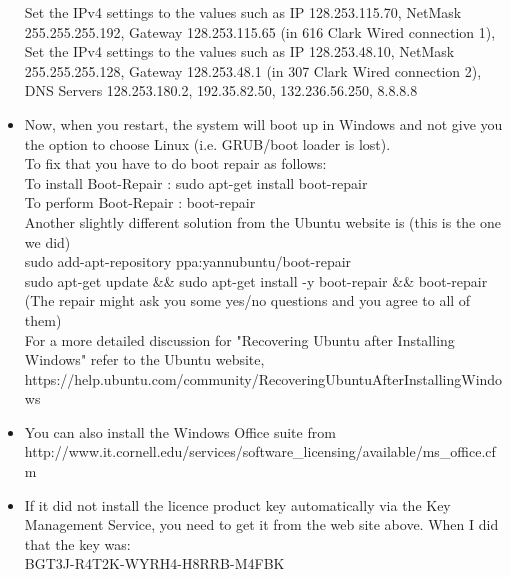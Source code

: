 \documentclass[12pt]{article}
\begin{document}
\begin{itemize}
      Set the IPv4 settings to the values such as IP 128.253.115.70, NetMask 255.255.255.192, Gateway 128.253.115.65 (in 616 Clark Wired connection 1), \\
      Set the IPv4 settings to the values such as IP 128.253.48.10, NetMask 255.255.255.128, Gateway 128.253.48.1 (in 307 Clark Wired connection 2), \\
      DNS Servers 128.253.180.2, 192.35.82.50, 132.236.56.250, 8.8.8.8
\item Now, when you restart, the system will boot up in Windows and not give you the option to choose Linux (i.e. GRUB/boot loader is lost). \\
      To fix that you have to do boot repair as follows:\\
      To install Boot-Repair : sudo apt-get install boot-repair\\
      To perform Boot-Repair : boot-repair \\
      Another slightly different solution from the Ubuntu website is (this is the one we did) \\
      sudo add-apt-repository ppa:yannubuntu/boot-repair \\
      sudo apt-get update \&\& sudo apt-get install -y boot-repair \&\& boot-repair  \\
      (The repair might ask you some yes/no questions and you agree to all of them)\\
      For a more detailed discussion for "Recovering Ubuntu after Installing Windows" refer to the Ubuntu website,\\
      https://help.ubuntu.com/community/RecoveringUbuntuAfterInstallingWindows
\item You can also install the Windows Office suite from \\
      http://www.it.cornell.edu/services/software\_licensing/available/ms\_office.cfm
\item If it did not install the licence product key automatically via the Key Management Service,
      you need to get it from the web site above.  When I did that the key was:\\
      BGT3J-R4T2K-WYRH4-H8RRB-M4FBK
\end{itemize}
\end{document}
